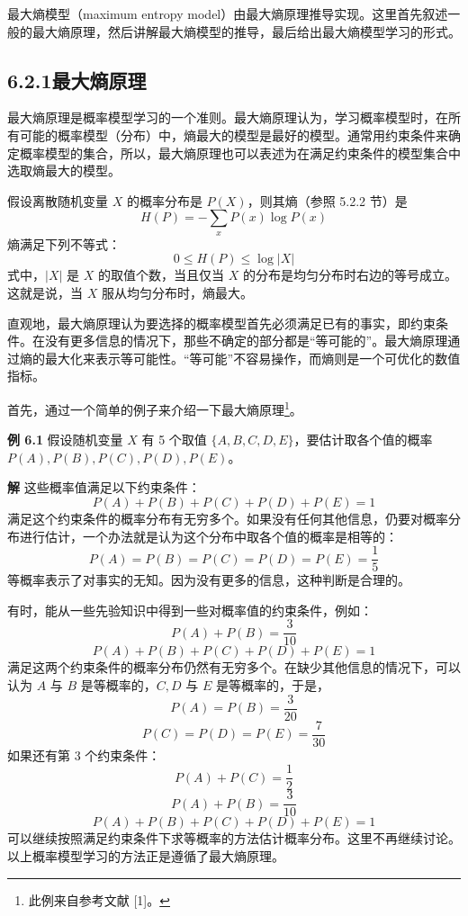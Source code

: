 \documentclass[UTF8, 12pt, fontset=fandol, oneside]{ctexart}
\begin{document}
最大熵模型（maximum entropy model）由最大熵原理推导实现。这里首先叙述一般的最大熵原理，然后讲解最大熵模型的推导，最后给出最大熵模型学习的形式。

\subsection*{6.2.1\quad 最大熵原理}

最大熵原理是概率模型学习的一个准则。最大熵原理认为，学习概率模型时，在所有可能的概率模型（分布）中，熵最大的模型是最好的模型。通常用约束条件来确定概率模型的集合，所以，最大熵原理也可以表述为在满足约束条件的模型集合中选取熵最大的模型。

假设离散随机变量 $X$ 的概率分布是 $P(X)$，则其熵（参照 5.2.2 节）是
\begin{equation}
H(P)=-\sum_x P(x)\log P(x)
\tag{6.9}
\end{equation}
熵满足下列不等式：
\[
0\leq H(P)\leq \log |X|
\]
式中，$|X|$ 是 $X$ 的取值个数，当且仅当 $X$ 的分布是均匀分布时右边的等号成立。这就是说，当 $X$ 服从均匀分布时，熵最大。

直观地，最大熵原理认为要选择的概率模型首先必须满足已有的事实，即约束条件。在没有更多信息的情况下，那些不确定的部分都是“等可能的”。最大熵原理通过熵的最大化来表示等可能性。“等可能”不容易操作，而熵则是一个可优化的数值指标。

首先，通过一个简单的例子来介绍一下最大熵原理\footnote{此例来自参考文献 [1]。}。

\noindent\textbf{例 6.1}\quad
假设随机变量 $X$ 有 5 个取值 $\{A,B,C,D,E\}$，要估计取各个值的概率 $P(A),P(B),P(C),P(D),P(E)$。

\noindent\textbf{解}\quad
这些概率值满足以下约束条件：
\[
P(A)+P(B)+P(C)+P(D)+P(E)=1
\]
满足这个约束条件的概率分布有无穷多个。如果没有任何其他信息，仍要对概率分布进行估计，一个办法就是认为这个分布中取各个值的概率是相等的：
\[
P(A)=P(B)=P(C)=P(D)=P(E)=\frac{1}{5}
\]
等概率表示了对事实的无知。因为没有更多的信息，这种判断是合理的。

有时，能从一些先验知识中得到一些对概率值的约束条件，例如：
\[
P(A)+P(B)=\frac{3}{10}
\]
\[
P(A)+P(B)+P(C)+P(D)+P(E)=1
\]
满足这两个约束条件的概率分布仍然有无穷多个。在缺少其他信息的情况下，可以认为 $A$ 与 $B$ 是等概率的，$C,D$ 与 $E$ 是等概率的，于是，
\[
P(A)=P(B)=\frac{3}{20}
\]
\[
P(C)=P(D)=P(E)=\frac{7}{30}
\]
如果还有第 3 个约束条件：
\[
P(A)+P(C)=\frac{1}{2}
\]
\[
P(A)+P(B)=\frac{3}{10}
\]
\[
P(A)+P(B)+P(C)+P(D)+P(E)=1
\]
可以继续按照满足约束条件下求等概率的方法估计概率分布。这里不再继续讨论。以上概率模型学习的方法正是遵循了最大熵原理。
\end{document}
